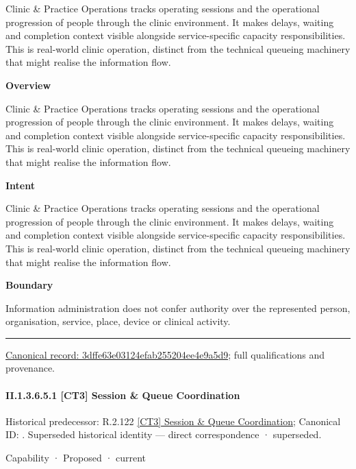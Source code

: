 Clinic \& Practice Operations tracks operating sessions and the operational progression of people through the clinic environment. It makes delays, waiting and completion context visible alongside service-specific capacity responsibilities. This is real-world clinic operation, distinct from the technical queueing machinery that might realise the information flow.



\textbf{Overview}



Clinic \& Practice Operations tracks operating sessions and the operational progression of people through the clinic environment. It makes delays, waiting and completion context visible alongside service-specific capacity responsibilities. This is real-world clinic operation, distinct from the technical queueing machinery that might realise the information flow.



\textbf{Intent}



Clinic \& Practice Operations tracks operating sessions and the operational progression of people through the clinic environment. It makes delays, waiting and completion context visible alongside service-specific capacity responsibilities. This is real-world clinic operation, distinct from the technical queueing machinery that might realise the information flow.



\textbf{Boundary}



Information administration does not confer authority over the represented person, organisation, service, place, device or clinical activity.



\medskip\hrule\medskip

{\footnotesize \href{../../../../../../../continuum/strategy/capability/3dffe63e03124efab255204ee4e9a5d9.md}{Canonical record: 3dffe63e03124efab255204ee4e9a5d9}; full qualifications and provenance.}\par
\paragraph*{II.1.3.6.5.1 [CT3] Session \& Queue Coordination}
\label{navigation:II.1.3.6.5.1}

{\small Historical predecessor: R.2.122 \hyperref[element:5298c6170cef4f05a6d956da716071bd]{[CT3] Session \& Queue Coordination}; Canonical ID: \texttt{}. Superseded historical identity — direct correspondence · superseded.}\par
\label{element:22981a95ca6e466582363706fde8fceb}
{\small Capability · Proposed · current}\par

